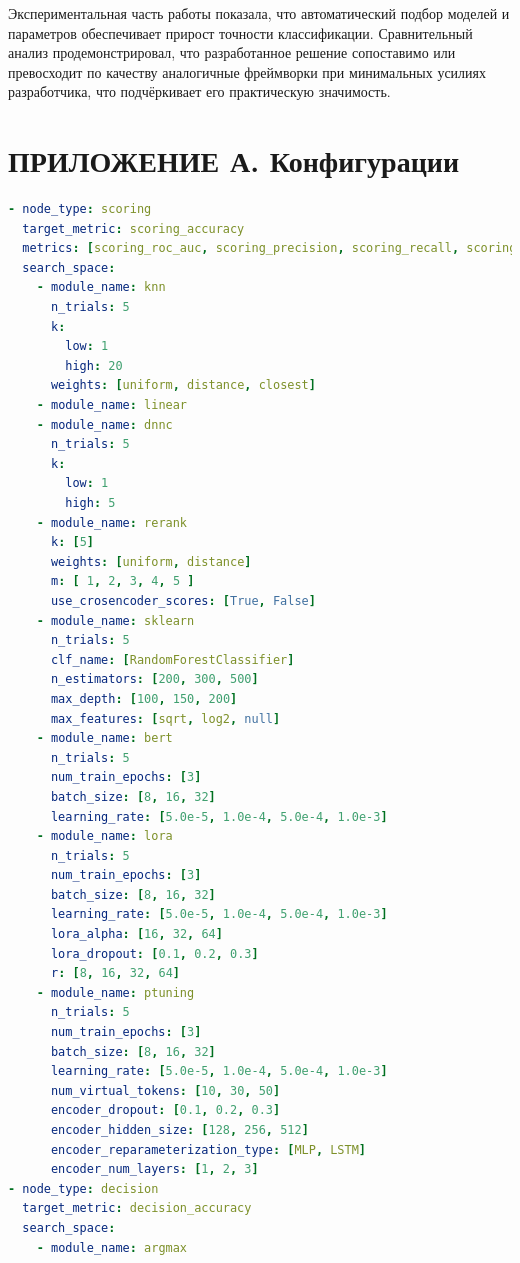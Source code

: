 \documentclass[14pt,a4paper,oneside,openany]{extbook}
\begin{document}
Экспериментальная часть работы показала, что автоматический подбор моделей и параметров обеспечивает прирост точности классификации. Сравнительный анализ продемонстрировал, что разработанное решение сопоставимо или превосходит по качеству аналогичные фреймворки при минимальных усилиях разработчика, что подчёркивает его практическую значимость.

\printbibliography[title=СПИСОК\spaceИСПОЛЬЗОВАНЫХ\spaceИСТОЧНИКОВ]
\appendix
\chapter*{ПРИЛОЖЕНИЕ А. Конфигурации}
\label{sec:orga9676c5}
\begin{lstlisting}[language=yaml,label=src:light_backbone,caption={Параметры для сравнения модулей с параметрами по-умолчанию},captionpos=b,numbers=none]
- node_type: scoring
  target_metric: scoring_accuracy
  metrics: [scoring_roc_auc, scoring_precision, scoring_recall, scoring_f1]
  search_space:
    - module_name: knn
      n_trials: 5
      k:
        low: 1
        high: 20
      weights: [uniform, distance, closest]
    - module_name: linear
    - module_name: dnnc
      n_trials: 5
      k:
        low: 1
        high: 5
    - module_name: rerank
      k: [5]
      weights: [uniform, distance]
      m: [ 1, 2, 3, 4, 5 ]
      use_crosencoder_scores: [True, False]
    - module_name: sklearn
      n_trials: 5
      clf_name: [RandomForestClassifier]
      n_estimators: [200, 300, 500]
      max_depth: [100, 150, 200]
      max_features: [sqrt, log2, null]
    - module_name: bert
      n_trials: 5
      num_train_epochs: [3]
      batch_size: [8, 16, 32]
      learning_rate: [5.0e-5, 1.0e-4, 5.0e-4, 1.0e-3]
    - module_name: lora
      n_trials: 5
      num_train_epochs: [3]
      batch_size: [8, 16, 32]
      learning_rate: [5.0e-5, 1.0e-4, 5.0e-4, 1.0e-3]
      lora_alpha: [16, 32, 64]
      lora_dropout: [0.1, 0.2, 0.3]
      r: [8, 16, 32, 64]
    - module_name: ptuning
      n_trials: 5
      num_train_epochs: [3]
      batch_size: [8, 16, 32]
      learning_rate: [5.0e-5, 1.0e-4, 5.0e-4, 1.0e-3]
      num_virtual_tokens: [10, 30, 50]
      encoder_dropout: [0.1, 0.2, 0.3]
      encoder_hidden_size: [128, 256, 512]
      encoder_reparameterization_type: [MLP, LSTM]
      encoder_num_layers: [1, 2, 3]
- node_type: decision
  target_metric: decision_accuracy
  search_space:
    - module_name: argmax
\end{lstlisting}
\end{document}
